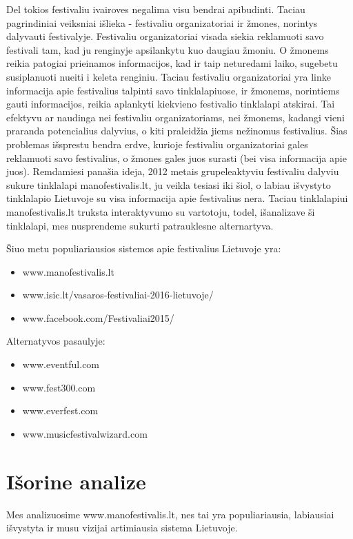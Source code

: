 ﻿\documentclass{VUMIFPSkursinis}
\begin{document}
Del tokios festivaliu ivairoves negalima visu bendrai apibudinti. Taciau pagrindiniai veiksniai išlieka - festivaliu organizatoriai ir žmones, norintys dalyvauti festivalyje. 
Festivaliu organizatoriai visada siekia reklamuoti savo festivali tam, kad ju renginyje apsilankytu kuo daugiau žmoniu. 
O žmonems reikia patogiai prieinamos informacijos, kad ir taip neturedami laiko, sugebetu susiplanuoti nueiti i keleta renginiu. 
Taciau festivaliu organizatoriai yra linke informacija apie festivalius talpinti savo tinklalapiuose, ir žmonems, norintiems gauti informacijos, reikia aplankyti kiekvieno festivalio tinklalapi atskirai. 
Tai efektyvu ar naudinga nei festivaliu organizatoriams, nei žmonems, kadangi vieni praranda potencialius dalyvius, o kiti praleidžia jiems nežinomus festivalius. 
Šias problemas išsprestu bendra erdve, kurioje festivaliu organizatoriai gales reklamuoti savo festivalius, o žmones gales juos surasti (bei visa informacija apie juos). 
Remdamiesi panašia ideja, 2012 metais grupeleaktyviu festivaliu dalyviu sukure tinklalapi manofestivalis.lt, ju veikla tesiasi iki šiol, o labiau išvystyto tinklalapio Lietuvoje su visa informacija apie festivalius nera. 
Taciau tinklalapiui manofestivalis.lt truksta interaktyvumo su vartotoju, todel, išanalizave ši tinklalapi, mes nusprendeme sukurti patrauklesne alternartyva. 

\vspace{5mm} 

\noindent
Šiuo metu populiariausios sistemos apie festivalius Lietuvoje yra:

\begin{itemize}
\item www.manofestivalis.lt
\item www.isic.lt/vasaros-festivaliai-2016-lietuvoje/
\item www.facebook.com/Festivaliai2015/
\end{itemize}

\noindent
Alternatyvos pasaulyje:

\begin{itemize}
\item www.eventful.com
\item www.fest300.com
\item www.everfest.com
\item www.musicfestivalwizard.com
\end{itemize}

\section{Išorine analize}
Mes analizuosime www.manofestivalis.lt, nes tai yra populiariausia, labiausiai išvystyta ir musu vizijai artimiausia sistema Lietuvoje.
\end{document}
